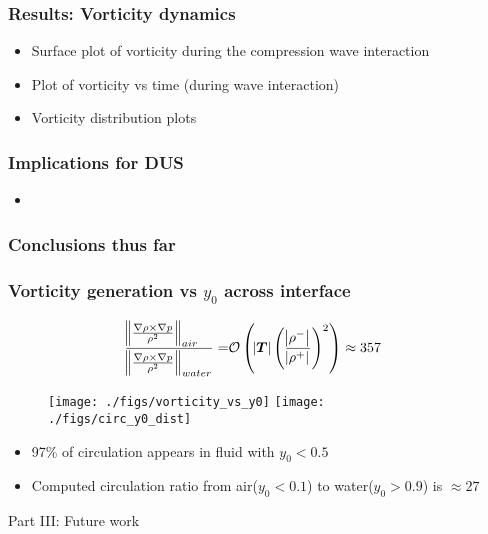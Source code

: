 \begin{frame} \frametitle{Results: Vorticity dynamics}
  \begin{itemize}
  \item Surface plot of vorticity during the compression wave interaction
  \item Plot of vorticity vs time (during wave interaction)
  \item Vorticity distribution plots
  \end{itemize}
\end{frame}
\begin{frame} \frametitle{Implications for DUS}
  \begin{itemize}
  \item 
  \end{itemize}
\end{frame}
\begin{frame} \frametitle{Conclusions thus far}

\end{frame}

\begin{frame} \frametitle{Vorticity generation vs $y_0$ across interface}
{\scriptsize
  \begin{align}%
    \label{eq:baroclinic_air_water}%
    \frac{\norm{\frac{\nabla\rho\times\nabla p}{\rho^2}}_{air\quad}}{\norm{\frac{\nabla\rho\times\nabla p}{\rho^2}}_{water}}%
    =&\orderof{\abs{\boldsymbol{T}}\left(\frac{\abs{\rho^-}}{\abs{\rho^+}}\right)^2}%
    \approx 357
  \end{align}
  \vspace*{-.5cm}
  \begin{figure}
    \hfill
    \texttt{[image: ./figs/vorticity\_vs\_y0]} \hfill
    \texttt{[image: ./figs/circ\_y0\_dist]}
    \hfill
  \end{figure}
  \vspace*{-.5cm}
  \begin{itemize}
    \item 97\% of circulation appears in fluid with $y_0<0.5$
    \item Computed circulation ratio from air($y_0<0.1$) to water($y_0>0.9$) is $\approx 27$
  \end{itemize}
}
\end{frame}
\begin{frame}
  \centering
  \begin{center}
    \LARGE Part III: Future work
  \end{center}
\end{frame}


